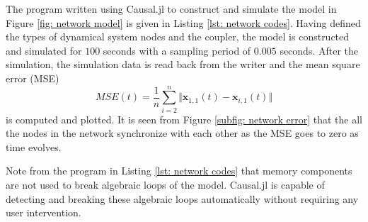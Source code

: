 \documentclass{juliacon}
\begin{document}
The program written using Causal.jl to construct and simulate the model in Figure \ref{fig: network model} is given in Listing \ref{lst: network codes}. Having defined the types of dynamical system nodes and the coupler, the model is constructed and simulated for $100$ seconds with a sampling period of $0.005$ seconds. After the simulation, the simulation data is read back from the writer and the mean square error (MSE) 
\begin{equation}
    MSE(t) = \dfrac{1}{n} \sum_{i = 2}^n \Vert \bm{x}_{1,1}(t) - \bm{x}_{i,1}(t) \Vert
\end{equation}
is computed and plotted. It is seen from Figure \ref{subfig: network error} that the all the nodes in the network synchronize with each other as the MSE goes to zero as time evolves. 

Note from the program in Listing \ref{lst: network codes} that memory components are not used to break algebraic loops of the model. Causal.jl is capable of detecting and breaking these algebraic loops automatically without requiring any user intervention. 
\end{document}
